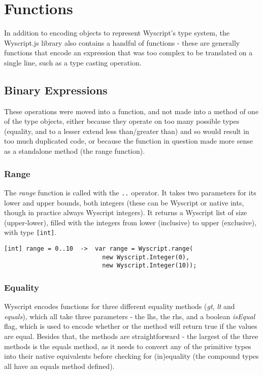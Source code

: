 \chapter{Functions}

In addition to encoding objects to represent Wyscript's type system, the Wyscript.js library also contains a handful of functions - these are generally functions that encode an expression that was too complex to be translated on a single line, such as a type casting operation.

\section{Binary Expressions}
\label{c_functions_binary}

These operations were moved into a function, and not made into a method of one of the type objects, either because they operate on too many possible types (equality, and to a lesser extend less than/greater than) and so would result in too much duplicated code, or because the function in question made more sense as a standalone method (the range function).

\subsection{Range}
\label{c_functions_range}

The {\em range} function is called with the \lstinline{..} operator. It takes two parameters for its lower and upper bounds, both integers (these can be Wyscript or native ints, though in practice always Wyscript integers). It returns a Wyscript list of size (upper-lower), filled with the integers from lower (inclusive) to upper (exclusive), with type \lstinline{[int]}.

\begin{lstlisting}
[int] range = 0..10  ->  var range = Wyscript.range(
                           new Wyscript.Integer(0),
                           new Wyscript.Integer(10));
\end{lstlisting}

\subsection{Equality}
\label{c_functions_equality}

Wyscript encodes functions for three different equality methods ({\em gt}, {\em lt} and {\em equals}), which all take three parameters - the lhs, the rhs, and a boolean {\em isEqual} flag, which is used to encode whether or the method will return true if the values are equal. Besides that, the methods are straightforward - the largest of the three methods is the equals method, as it needs to convert any of the primitive types into their native equivalents before checking for (in)equality (the compound types all have an equals method defined).

